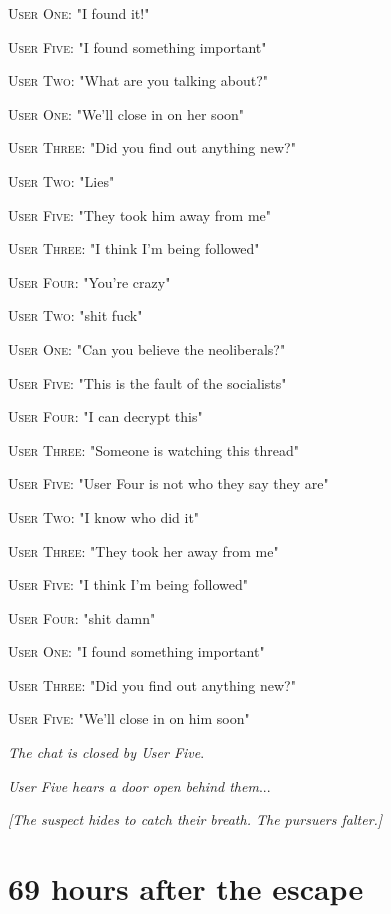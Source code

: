 \documentclass{report}
\begin{document}
\textsc{User One}: "I found it!" 

\textsc{User Five}: "I found something important" 

\textsc{User Two}: "What are you talking about?" 

\textsc{User One}: "We'll close in on her soon" 

\textsc{User Three}: "Did you find out anything new?" 

\textsc{User Two}: "Lies" 

\textsc{User Five}: "They took him away from me" 

\textsc{User Three}: "I think I'm being followed" 

\textsc{User Four}: "You're crazy" 

\textsc{User Two}: "shit fuck" 

\textsc{User One}: "Can you believe the neoliberals?" 

\textsc{User Five}: "This is the fault of the socialists" 

\textsc{User Four}: "I can decrypt this" 

\textsc{User Three}: "Someone is watching this thread" 

\textsc{User Five}: "User Four is not who they say they are" 

\textsc{User Two}: "I know who did it" 

\textsc{User Three}: "They took her away from me" 

\textsc{User Five}: "I think I'm being followed" 

\textsc{User Four}: "shit damn" 

\textsc{User One}: "I found something important" 

\textsc{User Three}: "Did you find out anything new?" 

\textsc{User Five}: "We'll close in on him soon" 

\textit{The chat is closed by User Five}. 

\textit{User Five hears a door open behind them}...

\textit{[The suspect hides to catch their breath. The pursuers falter.]}


\section*{69 \small{hours after the escape}}
\end{document}
